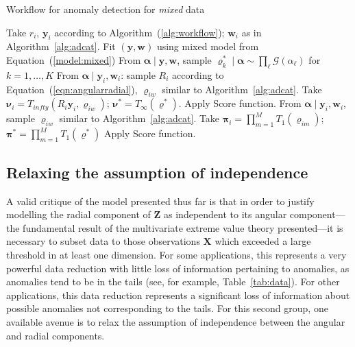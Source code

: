 \begin{algorithm}[htb]
    \caption{Workflow for anomaly detection for \emph{mixed} data}\label{alg:admixed}
    \begin{algorithmic}[1]
        \State Take $r_i$, $\bm{y}_i$ according to Algorithm~(\ref{alg:workflow}); $\bm{w}_i$ as in Algorithm~\ref{alg:adcat}.
        \State Fit $(\bm{y},\bm{w})$ using mixed model from Equation~(\ref{model:mixed})
        \State From $\bm{\alpha}\mid\bm{y},\bm{w}$, sample
            $\bm{\varrho}_k^{*}\mid\bm{\alpha}\sim\prod_{\ell}\mathcal{G}(\alpha_{\ell})$ for $k = 1,\ldots,K$
            \State From $\bm{\alpha}\mid\bm{y}_i,\bm{w}_i$:
                sample $R_i$ according to Equation~(\ref{eqn:angularradial}), 
                $\bm{\varrho}_{iw}$ similar to Algorithm~\ref{alg:adcat}.
            \State Take $\bm{\nu}_i = T_{infty}(R_i\bm{y}_i,\bm{\varrho}_{iw})$;      
                $\bm{\nu}^* = T_{\infty}(\bm{\varrho}^*)$.
            \State Apply Score function.
            \State From $\bm{\alpha}\mid\bm{y}_i,\bm{w}_i$, 
                sample $\bm{\varrho}_{iw}$ similar to Algorithm~\ref{alg:adcat}.
            \State Take $\bm{\pi}_i = \prod_{m = 1}^M T_{1}(\bm{\varrho}_{im})$;    
                $\bm{\pi}^* = \prod_{m = 1}^{M} T_1(\bm{\varrho}^*)$
            \State Apply Score function.
        \EndIf
    \end{algorithmic}
\end{algorithm}

\subsection{Relaxing the assumption of independence\label{subsec:rank}}
A valid critique of the model presented thus far is that in order to justify 
    modelling the radial component of $\bm{Z}$ as independent to its angular 
    component---the fundamental result of the multivariate extreme value theory 
    presented---it is necessary to subset data to those observations $\bm{X}$ 
    which exceeded a large threshold in at least one dimension.  For some 
    applications, this represents a very powerful data reduction with little loss of 
    information pertaining to anomalies, as anomalies tend to be in the tails 
    (see, for  example, Table~\ref{tab:data}).  For other applications, this 
    data reduction represents a significant loss of information about possible
    anomalies not corresponding to the tails.  For this second group,
    one available avenue is to relax the assumption of independence between the 
    angular and radial components.

